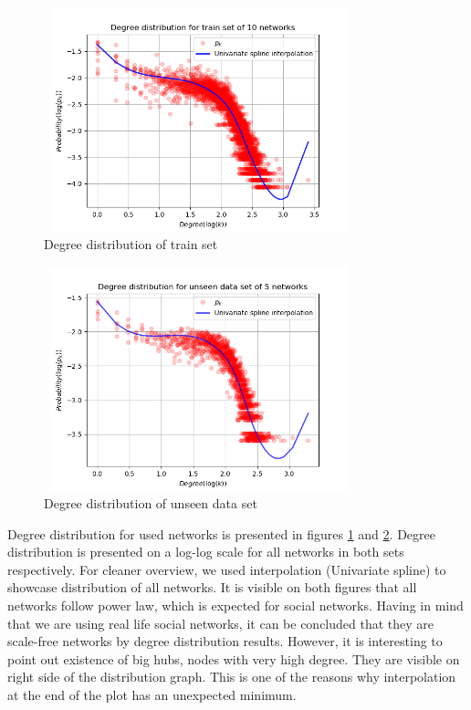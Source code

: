 \documentclass[9pt,twocolumn,twoside]{pnas-new}
\begin{document}
\newpage
\begin{figure}[h!]%
\centering
\includegraphics[width=9cm, height=6.5cm]{deg_dist_train.png}
\caption{Degree distribution of train set}
\label{fig:degtrain}
\end{figure}
\begin{figure}[h!]%
\centering
\includegraphics[width=9cm, height=6.5cm]{deg_dist_unseen.png}
\caption{Degree distribution of unseen data set}
\label{fig:degunseen}
\end{figure}

Degree distribution for used networks is presented in figures \ref{fig:degtrain} and \ref{fig:degunseen}. Degree distribution is presented on a log-log scale for all networks in both sets respectively. For cleaner overview, we used interpolation (Univariate spline) to showcase distribution of all networks. It is visible on both figures that all networks follow power law, which is expected for social networks. Having in mind that we are using real life social networks, it can be concluded that they are scale-free networks by degree distribution results. However, it is interesting to point out existence of big hubs, nodes with very high degree. They are visible on right side of the distribution graph. This is one of the reasons why interpolation at the end of the plot has an unexpected minimum. 
\end{document}
